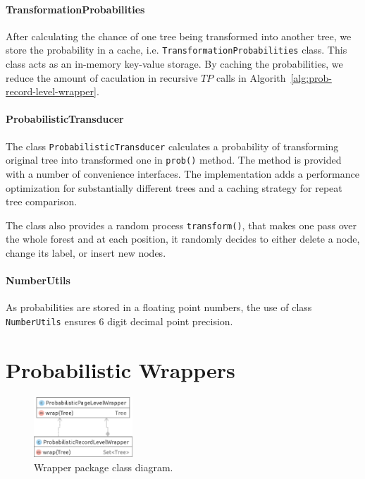 \paragraph{TransformationProbabilities} After calculating the chance of one tree being transformed into another tree, we store the probability in a cache, i.e. \texttt{TransformationProbabilities} class. This class acts as an in-memory key-value storage. By caching the probabilities, we reduce the amount of caculation in recursive $TP$ calls in Algorith~\ref{alg:prob-record-level-wrapper}.

\paragraph{ProbabilisticTransducer} The class \texttt{ProbabilisticTransducer} calculates a probability of transforming original tree into transformed one in \texttt{prob()} method. The method is provided with a number of convenience interfaces. The implementation adds a performance optimization for substantially different trees and a caching strategy for repeat tree comparison.

The class also provides a random process \texttt{transform()}, that makes one pass over the whole forest and at each position, it randomly decides to either delete a node, change its label, or insert new nodes.

\paragraph{NumberUtils} As probabilities are stored in a floating point numbers, the use of class \texttt{NumberUtils} ensures 6 digit decimal point precision.


\section{Probabilistic Wrappers}


\begin{figure}[h]
	\centering
	\includegraphics[width=0.33\textwidth]{figures/package-wrapper}
	\caption{Wrapper package class diagram.}
	\label{fig:package-wrapper}
\end{figure}

